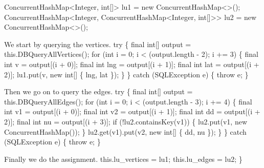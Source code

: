 \documentclass{article}
\def\nwendcode{\endtrivlist \endgroup}      %
\let\nwdocspar=\par
\theoremstyle{definition}                   %
\begin{document}
\nwenddocs{}\plusendmoddef
  ConcurrentHashMap<Integer, int[]>    lu1 = new ConcurrentHashMap<>();
  ConcurrentHashMap<Integer,
    ConcurrentHashMap<Integer, int[]>> lu2 = new ConcurrentHashMap<>();
\nwendcode{}\nwdocspar
{\small We start by querying the vertices.}
\nwenddocs{}\plusendmoddef
  try \{
    final int[] output = this.DBQueryAllVertices();
    for (int i = 0; i < (output.length - 2); i += 3) \{
      final int   v = output[(i + 0)];
      final int lng = output[(i + 1)];
      final int lat = output[(i + 2)];
      lu1.put(v, new int[] \{ lng, lat \});
    \}
  \} catch (SQLException e) \{
    throw e;
  \}
\nwendcode{}\nwdocspar
{\small Then we go on to query the edges.}
\nwenddocs{}\plusendmoddef
  try \{
    final int[] output = this.DBQueryAllEdges();
    for (int i = 0; i < (output.length - 3); i += 4) \{
      final int v1 = output[(i + 0)];
      final int v2 = output[(i + 1)];
      final int dd = output[(i + 2)];
      final int nu = output[(i + 3)];
      if (!lu2.containsKey(v1)) \{
        lu2.put(v1, new ConcurrentHashMap());
      \}
      lu2.get(v1).put(v2, new int[] \{ dd, nu \});
    \}
  \} catch (SQLException e) \{
    throw e;
  \}
\nwendcode{}\nwdocspar
{\small Finally we do the assignment.}
\nwenddocs{}\plusendmoddef
  this.lu_vertices = lu1;
  this.lu_edges    = lu2;
\}
\nwendcode{}\nwdocspar
\end{document}
